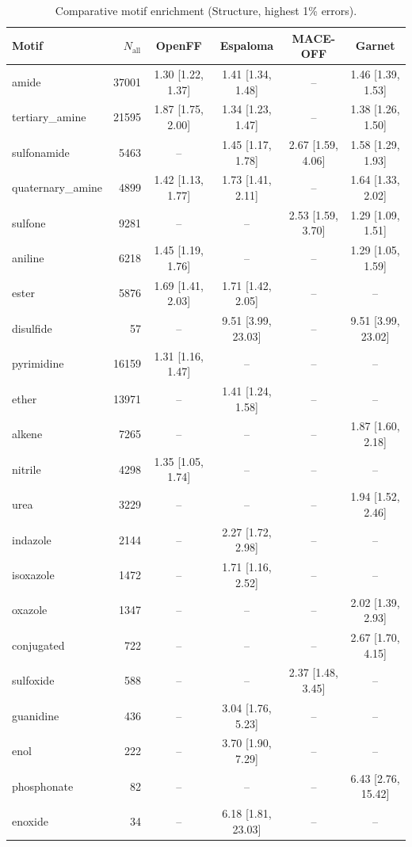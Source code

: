 \begin{table}[h!]
  \centering
  \small
  \setlength{\tabcolsep}{5pt}
  \renewcommand{\arraystretch}{1.15}
  \begin{tabular}{l r c c c c}
    \hline
    Motif & $N_\mathrm{all}$ & OpenFF & Espaloma & MACE-OFF & Garnet \\
    \hline
    amide & 37001 & 1.30\,\,[1.22, 1.37] & 1.41\,\,[1.34, 1.48] & -- & 1.46\,\,[1.39, 1.53] \\
    tertiary\_amine & 21595 & 1.87\,\,[1.75, 2.00] & 1.34\,\,[1.23, 1.47] & -- & 1.38\,\,[1.26, 1.50] \\
    sulfonamide & 5463 & -- & 1.45\,\,[1.17, 1.78] & 2.67\,\,[1.59, 4.06] & 1.58\,\,[1.29, 1.93] \\
    quaternary\_amine & 4899 & 1.42\,\,[1.13, 1.77] & 1.73\,\,[1.41, 2.11] & -- & 1.64\,\,[1.33, 2.02] \\
    \hdashline
    sulfone & 9281 & -- & -- & 2.53\,\,[1.59, 3.70] & 1.29\,\,[1.09, 1.51] \\
    aniline & 6218 & 1.45\,\,[1.19, 1.76] & -- & -- & 1.29\,\,[1.05, 1.59] \\
    ester & 5876 & 1.69\,\,[1.41, 2.03] & 1.71\,\,[1.42, 2.05] & -- & -- \\
    disulfide & 57 & -- & 9.51\,\,[3.99, 23.03] & -- & 9.51\,\,[3.99, 23.02] \\
    \hdashline
    pyrimidine & 16159 & 1.31\,\,[1.16, 1.47] & -- & -- & -- \\
    ether & 13971 & -- & 1.41\,\,[1.24, 1.58] & -- & -- \\
    alkene & 7265 & -- & -- & -- & 1.87\,\,[1.60, 2.18] \\
    nitrile & 4298 & 1.35\,\,[1.05, 1.74] & -- & -- & -- \\
    urea & 3229 & -- & -- & -- & 1.94\,\,[1.52, 2.46] \\
    indazole & 2144 & -- & 2.27\,\,[1.72, 2.98] & -- & -- \\
    isoxazole & 1472 & -- & 1.71\,\,[1.16, 2.52] & -- & -- \\
    oxazole & 1347 & -- & -- & -- & 2.02\,\,[1.39, 2.93] \\
    conjugated & 722 & -- & -- & -- & 2.67\,\,[1.70, 4.15] \\
    sulfoxide & 588 & -- & -- & 2.37\,\,[1.48, 3.45] & -- \\
    guanidine & 436 & -- & 3.04\,\,[1.76, 5.23] & -- & -- \\
    enol & 222 & -- & 3.70\,\,[1.90, 7.29] & -- & -- \\
    phosphonate & 82 & -- & -- & -- & 6.43\,\,[2.76, 15.42] \\
    enoxide & 34 & -- & 6.18\,\,[1.81, 23.03] & -- & -- \\
    \hline
  \end{tabular}
  \caption{Comparative motif enrichment (Structure, highest 1\% errors).}
  \label{tab:compare_structure_worst}
\end{table}